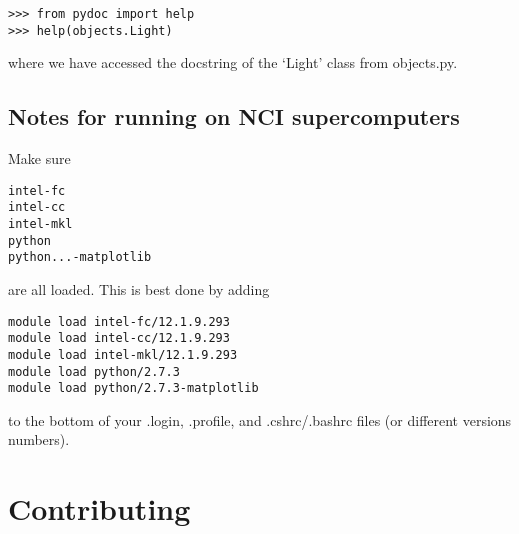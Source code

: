 \documentclass[11pt,a4paper,twoside]{report}
\begin{document}
\begin{lstlisting}
>>> from pydoc import help
>>> help(objects.Light)
\end{lstlisting}

where we have accessed the docstring of the `Light' class from objects.py.







\section{Notes for running \CodeName on NCI supercomputers}

Make sure 

\begin{lstlisting}
intel-fc
intel-cc
intel-mkl
python
python...-matplotlib
\end{lstlisting}

are all loaded. This is best done by adding

\begin{lstlisting}
module load intel-fc/12.1.9.293
module load intel-cc/12.1.9.293
module load intel-mkl/12.1.9.293
module load python/2.7.3
module load python/2.7.3-matplotlib
\end{lstlisting}

to the bottom of your .login, .profile, and .cshrc/.bashrc files (or different versions numbers).





\chapter{Contributing}
\label{Cont}
\end{document}
